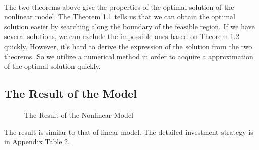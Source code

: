 \documentclass{mcmthesis}
\begin{document}
\paragraph{}The two theorems above give the properties of the optimal solution of the nonlinear model. The Theorem 1.1 tells us that we can obtain the optimal solution easier by searching along the boundary of the feasible region. If we have several solutions, we can exclude the impossible ones based on Theorem 1.2 quickly. However, it's hard to derive the expression of the solution from the two theorems. So we utilize a numerical method in order to acquire a approximation of the optimal solution quickly.

\subsection{The Result of the Model}

\begin{figure} [H]
\centering
\begin{minipage}{\textwidth}
\end{minipage}
\caption{The Result of the Nonlinear Model}
\end{figure}

The result is similar to that of linear model. The detailed investment strategy is in Appendix Table 2.
\end{document}
